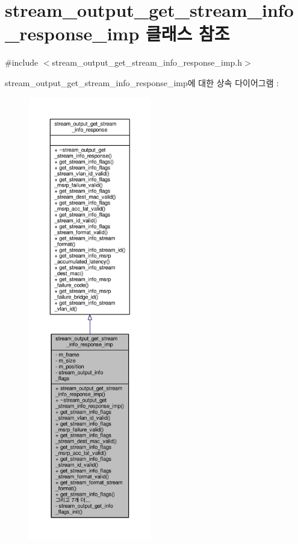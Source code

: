 \hypertarget{classavdecc__lib_1_1stream__output__get__stream__info__response__imp}{}\section{stream\+\_\+output\+\_\+get\+\_\+stream\+\_\+info\+\_\+response\+\_\+imp 클래스 참조}
\label{classavdecc__lib_1_1stream__output__get__stream__info__response__imp}


{\ttfamily \#include $<$stream\+\_\+output\+\_\+get\+\_\+stream\+\_\+info\+\_\+response\+\_\+imp.\+h$>$}



stream\+\_\+output\+\_\+get\+\_\+stream\+\_\+info\+\_\+response\+\_\+imp에 대한 상속 다이어그램 \+: 
\nopagebreak
\begin{figure}[H]
\begin{center}
\leavevmode
\includegraphics[height=550pt]{classavdecc__lib_1_1stream__output__get__stream__info__response__imp__inherit__graph}
\end{center}
\end{figure}


